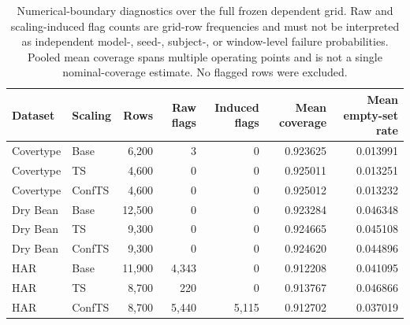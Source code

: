 \begin{table}[t]
\centering
\caption{Numerical-boundary diagnostics over the full frozen dependent grid. Raw and scaling-induced flag counts are grid-row frequencies and must not be interpreted as independent model-, seed-, subject-, or window-level failure probabilities. Pooled mean coverage spans multiple operating points and is not a single nominal-coverage estimate. No flagged rows were excluded.}
\label{tab:t5b-numerical}
\small
\begin{tabular}{llrrrrr}
\hline
Dataset & Scaling & Rows & Raw flags & Induced flags & Mean coverage & Mean empty-set rate \\
\hline
Covertype & Base & 6,200 & 3 & 0 & 0.923625 & 0.013991 \\
Covertype & TS & 4,600 & 0 & 0 & 0.925011 & 0.013251 \\
Covertype & ConfTS & 4,600 & 0 & 0 & 0.925012 & 0.013232 \\
Dry Bean & Base & 12,500 & 0 & 0 & 0.923284 & 0.046348 \\
Dry Bean & TS & 9,300 & 0 & 0 & 0.924665 & 0.045108 \\
Dry Bean & ConfTS & 9,300 & 0 & 0 & 0.924620 & 0.044896 \\
HAR & Base & 11,900 & 4,343 & 0 & 0.912208 & 0.041095 \\
HAR & TS & 8,700 & 220 & 0 & 0.913767 & 0.046866 \\
HAR & ConfTS & 8,700 & 5,440 & 5,115 & 0.912702 & 0.037019 \\
\hline
\end{tabular}
\end{table}

